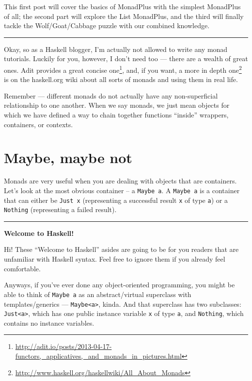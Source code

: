 \documentclass[]{article}
\renewcommand{\href}[2]{#2\footnote{\url{#1}}}
\begin{document}
This first post will cover the basics of MonadPlus with the simplest MonadPlus
of all; the second part will explore the List MonadPlus, and the third will
finally tackle the Wolf/Goat/Cabbage puzzle with our combined knowledge.

\begin{center}\rule{0.5\linewidth}{0.5pt}\end{center}

Okay, so as a Haskell blogger, I'm actually not allowed to write any monad
tutorials. Luckily for you, however, I don't need too --- there are a wealth of
great ones.
\href{http://adit.io/posts/2013-04-17-functors,_applicatives,_and_monads_in_pictures.html}{Adit
provides a great concise one}, and, if you want,
\href{http://www.haskell.org/haskellwiki/All_About_Monads}{a more in depth one}
is on the haskell.org wiki about all sorts of monads and using them in real
life.

Remember --- different monads do not actually have any non-superficial
relationship to one another. When we say monads, we just mean objects for which
we have defined a way to chain together functions ``inside'' wrappers,
containers, or contexts.

\section{Maybe, maybe not}\label{maybe-maybe-not}

Monads are very useful when you are dealing with objects that are containers.
Let's look at the most obvious container -- a \texttt{Maybe\ a}. A
\texttt{Maybe\ a} is a container that can either be \texttt{Just\ x}
(representing a successful result \texttt{x} of type \texttt{a}) or a
\texttt{Nothing} (representing a failed result).

\begin{center}\rule{0.5\linewidth}{0.5pt}\end{center}

\textbf{Welcome to Haskell!}

Hi! These ``Welcome to Haskell'' asides are going to be for you readers that are
unfamiliar with Haskell syntax. Feel free to ignore them if you already feel
comfortable.

Anyways, if you've ever done any object-oriented programming, you might be able
to think of \texttt{Maybe\ a} as an abstract/virtual superclass with
templates/generics --- \texttt{Maybe\textless{}a\textgreater{}}, kinda. And that
superclass has two subclasses: \texttt{Just\textless{}a\textgreater{}}, which
has one public instance variable \texttt{x} of type \texttt{a}, and
\texttt{Nothing}, which contains no instance variables.
\end{document}
